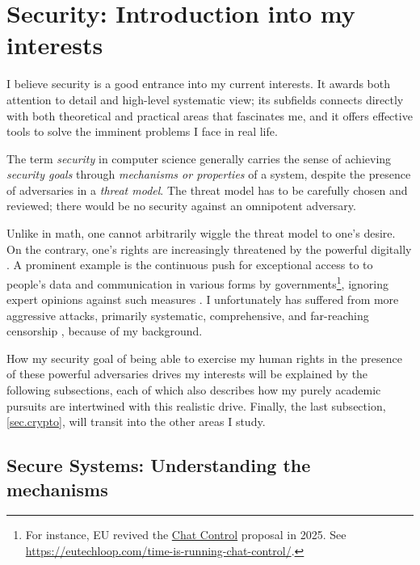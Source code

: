 \documentclass{article}
\begin{document}
\section{Security: Introduction into my interests}
I believe security is a good entrance into my current interests. It awards both
attention to detail and high-level systematic view; its subfields connects
directly with both theoretical and practical areas that fascinates me, and it
offers effective tools to solve the imminent problems I face in real life. 

The term \emph{security} in computer science generally carries the sense of
achieving \emph{security goals} through \emph{mechanisms or properties} of a
system, despite the presence of adversaries in a \emph{threat model}. The
threat model has to be carefully chosen and reviewed; there would be no
security against an omnipotent adversary.

Unlike in math, one cannot arbitrarily wiggle the threat model to one's desire.
On the contrary, one's rights are increasingly threatened by the
powerful digitally \cite{eu.digital.1, eu.digital.2, internet.shutdown.2024}. A
prominent example is the continuous push for exceptional access to to people's
data and communication in various forms by governments\footnote{ For instance,
	EU revived the \href{
https://eur-lex.europa.eu/legal-content/EN/TXT/?uri=COM\%3A2022\%3A209\%3AFIN}
{Chat Control} proposal in 2025. See \url{
https://eutechloop.com/time-is-running-chat-control/}.}, ignoring expert
opinions against such measures \cite{keys.under.doormats, bugs.in.our.pockets}.
I unfortunately has suffered from more aggressive attacks, primarily
systematic, comprehensive, and far-reaching censorship \cite{internet.coup}
\cite[Sect.~5]{chall.censor.circum}, because of my background.

How my security goal of being able to exercise my human rights in the presence of
these powerful adversaries drives my interests will be explained by the
following subsections, each of which also describes how my purely academic
pursuits are intertwined with this realistic drive. Finally, the last
subsection, \ref{sec.crypto}, will transit into the other areas I study.

\subsection{Secure Systems: Understanding the mechanisms} \label{sec.secure.systems}
\end{document}
